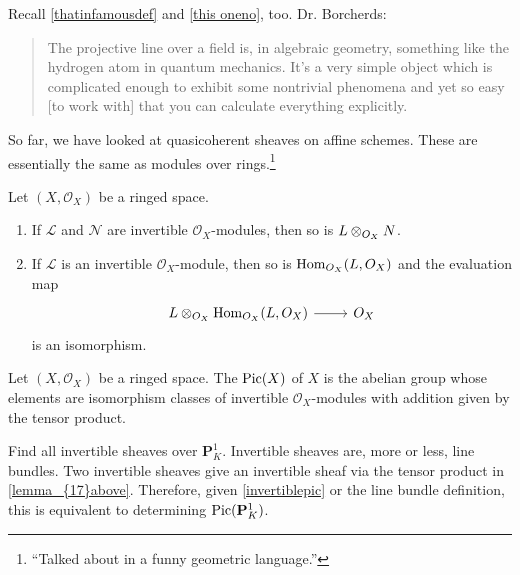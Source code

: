 \documentclass [11 pt, oneside] {article}
\begin{document}
Recall \cref{thatinfamousdef} and \cref{this oneno}, too. 
Dr. Borcherds:
\begin{quote}
	\small The projective line over a field is, in algebraic geometry, something like the hydrogen atom in quantum mechanics. It's a very simple object which is complicated enough to exhibit some nontrivial phenomena and yet so easy [to work with] that you can calculate everything explicitly.
\end{quote}
So far, we have looked at quasicoherent sheaves on affine schemes. These are essentially the same as modules over rings.\footnote{``Talked about in a funny geometric language.''}
\begin{proposition}\label{lemma_{17}above}
	Let $(X,\mathscr{O}_X)$ be a ringed space.
	\begin{enumerate}
		\item If $\mathscr{L}$ and $\mathscr{N}$ are invertible $\mathscr{O}_X$-modules, then so is $\relax{L}\otimes_{\relax{O}_X}\relax{N}$.
		\item If $\mathscr{L}$ is an invertible $\mathscr{O}_X$-module, then so is $\operatorname{Hom}_{\relax{O}_X}(\relax{L}, \relax{O}_X)$ and the evaluation map 
		\[
\begin{tikzcd}
\mathscr{L}\tensor_{\mathscr{O}_X} \Hom_{\mathscr{O}_X}(\mathscr{L}, \mathscr{O}_X)\ar[r]& \mathscr{O}_X
\end{tikzcd}
\] 
		is an isomorphism.
	\end{enumerate}
\end{proposition}
 \begin{definition}\label{invertiblepic}\text{}
Let $(X,\mathscr{O}_X)$ be a ringed space. The  $\operatorname{Pic} (X)$ of $X$ is the abelian group whose elements are isomorphism classes of invertible $\mathscr{O}_X$-modules with addition given by the tensor product.
\end{definition}

\begin{problem}
	Find all invertible sheaves over $\mathbf{P}^1_K$. Invertible sheaves are, more or less, line bundles. Two invertible sheaves give an invertible sheaf via the tensor product in \cref{lemma_{17}above}. Therefore, given \cref{invertiblepic} or the line bundle definition, this is equivalent to determining $\operatorname{Pic}(\mathbf{P}^1_K)$.
\end{problem}
\end{document}
